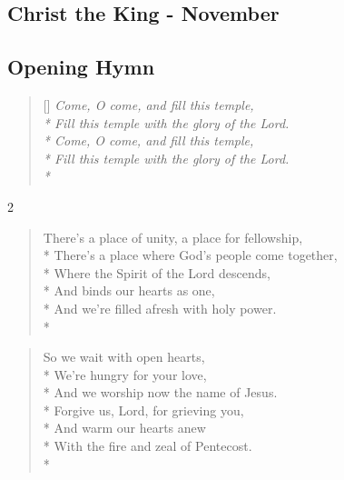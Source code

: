 \documentclass[12pt]{article}
\newcounter{count}
\newcommand\printcount{\addtocounter{count}{1}\thecount}
\begin{document}
\begin{center}
\section*{Christ the King -  November}


\subsection*{Opening Hymn}
\end{center}
\setcounter{count}{0}
\settowidth{\versewidth}{Fill this temple with the glory of the Lord.}
\begin{verse}[\versewidth]
\textit{Come, O come, and fill this temple,\\*
Fill this temple with the glory of the Lord.\\*
Come, O come, and fill this temple,\\*
Fill this temple with the glory of the Lord.\\*}
\end{verse}

\begin{multicols}{2}
\begin{verse}
\flagverse{\printcount.} There's a place of unity, a place for fellowship,\\*
There's a place where God's people come together,\\*
Where the Spirit of the Lord descends,\\*
And binds our hearts as one,\\*
And we're filled afresh with holy power.\\*
\end{verse}

\begin{verse}
\flagverse{\printcount.} So we wait with open hearts,\\*
We're hungry for your love,\\*
And we worship now the name of Jesus.\\*
Forgive us, Lord, for grieving you,\\*
And warm our hearts anew\\*
With the fire and zeal of Pentecost.\\*
\end{verse}
\end{multicols}
\end{document}
